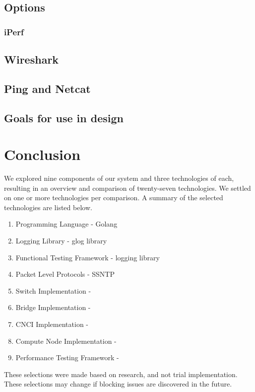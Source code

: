 \documentclass[10pt,letterpaper,onecolumn,draftclsnofoot]{IEEEtran}
\begin{document}
\subsection{Options}

\subsubsection{iPerf}

\subsection{Wireshark}

\subsection{Ping and Netcat}

\subsection{Goals for use in design}

\sebsection

\section{Conclusion}

We explored nine components of our system and three technologies of each,
resulting in an overview and comparison of twenty-seven technologies. We settled
on one or more technologies per comparison. A summary of the selected
technologies are listed below.

\begin{enumerate}
	\item Programming Language - Golang
	\item Logging Library - glog library
	\item Functional Testing Framework - logging library
	\item Packet Level Protocols - SSNTP
	\item Switch Implementation -
	\item Bridge Implementation -
	\item CNCI Implementation -
	\item Compute Node Implementation -
	\item Performance Testing Framework -
\end{enumerate}

These selections were made based on research, and not trial implementation.
These selections may change if blocking issues are discovered in the future.



\end{document}
